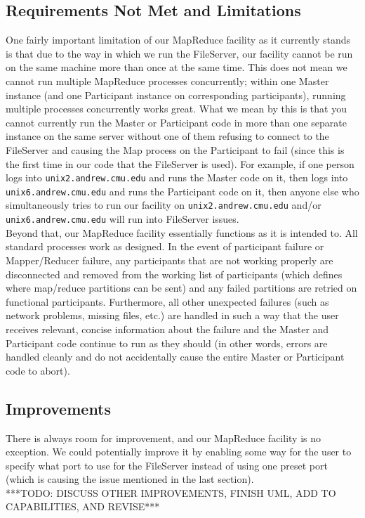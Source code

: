 \documentclass[12pt]{article}
\begin{document}
\subsection{Requirements Not Met and Limitations}

One fairly important limitation of our MapReduce facility as it currently stands is that due to the way in which we run the FileServer, our facility cannot be run on the same machine more than once at the same time. This does not mean we cannot run multiple MapReduce processes concurrently; within one Master instance (and one Participant instance on corresponding participants), running multiple processes concurrently works great. What we mean by this is that you cannot currently run the Master or Participant code in more than one separate instance on the same server without one of them refusing to connect to the FileServer and causing the Map process on the Participant to fail (since this is the first time in our code that the FileServer is used). For example, if one person logs into \verb|unix2.andrew.cmu.edu| and runs the Master code on it, then logs into \verb|unix6.andrew.cmu.edu| and runs the Participant code on it, then anyone else who simultaneously tries to run our facility on \verb|unix2.andrew.cmu.edu| and/or \verb|unix6.andrew.cmu.edu| will run into FileServer issues.\\

Beyond that, our MapReduce facility essentially functions as it is intended to. All standard processes work as designed. In the event of participant failure or Mapper/Reducer failure, any participants that are not working properly are disconnected and removed from the working list of participants (which defines where map/reduce partitions can be sent) and any failed partitions are retried on functional participants. Furthermore, all other unexpected failures (such as network problems, missing files, etc.) are handled in such a way that the user receives relevant, concise information about the failure and the Master and Participant code continue to run as they should (in other words, errors are handled cleanly and do not accidentally cause the entire Master or Participant code to abort).

\subsection{Improvements}

There is always room for improvement, and our MapReduce facility is no exception. We could potentially improve it by enabling some way for the user to specify what port to use for the FileServer instead of using one preset port (which is causing the issue mentioned in the last section). \\

***TODO: DISCUSS OTHER IMPROVEMENTS, FINISH UML, ADD TO CAPABILITIES, AND REVISE***
\end{document}
